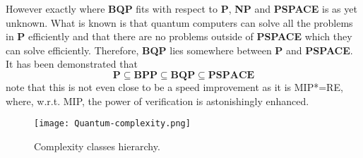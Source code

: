 However exactly where \textbf{BQP} fits with respect to \textbf{P}, \textbf{NP} and \textbf{PSPACE} is as yet unknown. What is known is that quantum computers can solve all the problems in \textbf{P} efficiently and that there are no problems outside of \textbf{PSPACE} which they can solve efficiently. Therefore, \textbf{BQP} lies somewhere between \textbf{P} and \textbf{PSPACE}.
It has been demonstrated that
\begin{equation*}
   \textbf{P}   \subseteq \textbf{BPP} \subseteq \textbf{BQP}  \subseteq \textbf{PSPACE}
\end{equation*}
note that this is not even close to be a speed improvement  as it is MIP*=RE, where, w.r.t. MIP, the power of verification is astonishingly enhanced.


\begin{figure}[htb]
    \texttt{[image: Quantum-complexity.png]}
    \centering
    \caption{Complexity classes hierarchy.}
    \end{figure}